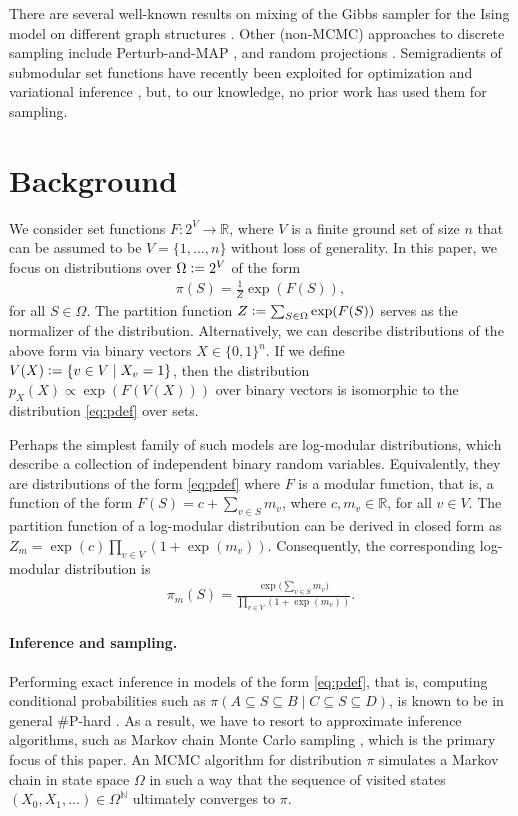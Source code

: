 There are several well-known results on mixing of the Gibbs sampler for the Ising model on different graph structures \citep{jerrum93,berger05,levin08,levin08book}.
Other (non-MCMC) approaches to discrete sampling include Perturb-and-MAP \citep{papandreou11,hazan13}, and random projections \citep{zhu15}.
Semigradients of submodular set functions have recently been exploited for optimization \citep{iyer13, jegelka11} and variational inference \citep{djolonga16}, but, to our knowledge, no prior work  has used them for sampling.


\section{Background}
We consider set functions $F : 2^V \to \mathbb{R}$, where $V$ is a finite ground set of size $n$ that can be assumed to be $V = \{1, \ldots, n\}$ without loss of generality.
In this paper, we focus on distributions over $\Omega \vcentcolon= 2^V$ of the form
\begin{align} \label{eq:pdef}
  \pi(S) = \frac{1}{Z} \exp\left( F(S) \right),
\end{align}
for all $S \in \Omega$.
The partition function $Z \vcentcolon= \sum_{S \in \Omega} \exp(F(S))$ serves as the normalizer of the distribution.
Alternatively, we can describe distributions of the above form via binary vectors $X \in \{0, 1\}^n$.
If we define $V(X) \vcentcolon= \{v \in V \mid X_v = 1\}$, then the distribution $p_X(X) \propto \exp(F(V(X)))$ over binary vectors is isomorphic to the distribution \eqref{eq:pdef} over sets.

Perhaps the simplest family of such models are log-modular distributions, which describe a collection of independent binary random variables.
Equivalently, they are distributions of the form \eqref{eq:pdef} where $F$ is a modular function, that is, a function of the form $F(S) = c + \sum_{v \in S}m_v$, where $c, m_v \in \mathbb{R}$, for all $v \in V$.
The partition function of a log-modular distribution can be derived in closed form as $Z_m = \exp(c) \prod_{v \in V} \left( 1 + \exp(m_v) \right)$.
Consequently, the corresponding log-modular distribution is
\begin{align*}
  \pi_m(S) = \frac{\exp\big( \sum_{v \in S} m_v \big)}{\prod_{v \in V} \left( 1 + \exp(m_v) \right)}.
\end{align*}

\paragraph{Inference and sampling.}
Performing exact inference in models of the form \eqref{eq:pdef}, that is, computing conditional probabilities such as $\pi(A \subseteq S \subseteq B \mid C \subseteq S \subseteq D)$, is known to be in general \#P-hard \citep{jerrum93}.
As a result, we have to resort to approximate inference algorithms, such as Markov chain Monte Carlo sampling \citep{levin08book}, which is the primary focus of this paper.
An MCMC algorithm for distribution $\pi$ simulates a Markov chain in state space $\Omega$ in such a way that the sequence of visited states $(X_0, X_1, \ldots) \in \Omega^{\mathbb{N}}$ ultimately converges to $\pi$.

